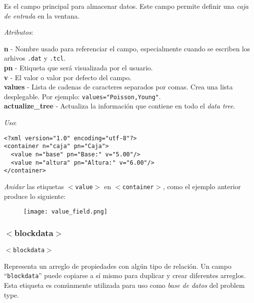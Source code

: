 \documentclass[10pt, a4paper, twocolumn]{article}
\begin{document}
Es el campo principal para almacenar datos. Este campo permite definir una \textit{caja de entrada} en la ventana.

\vspace{0.15cm}
\textit{Atributos}:

\vspace{0.15cm}
	\textbf{n} - Nombre usado para referenciar el campo, especialmente cuando se escriben los arhivos \texttt{.dat} y \texttt{.tcl}.\\
	\textbf{pn} - Etiqueta que será visualizada por el usuario.\\
	\textbf{v} - El valor o valor por defecto del campo.\\
	\textbf{values} - Lista de cadenas de caracteres separados por comas. Crea una lista desplegable. Por ejemplo: \texttt{values="Poisson,Young"}.\\
	\textbf{actualize\_tree} - Actualiza la información que contiene en todo el \textit{data tree}.
\vspace{0.15cm}

\textit{Uso}:
\vspace{0.15cm}

\lstset{language=XML} 
\begin{lstlisting}[caption={Creación de <value> para almacenar datos.}]
<?xml version="1.0" encoding="utf-8"?>
<container n="caja" pn="Caja">
  <value n="base" pn="Base:" v="5.00"/>
  <value n="altura" pn="Altura:" v="6.00"/>
</container>
\end{lstlisting}

\textit{Anidar} las etiquetas \texttt{$<$value$>$} en \texttt{$<$container$>$}, como el ejemplo anterior produce lo siguiente:

\begin{figure}[hbtp!]
	\centering
	\texttt{[image: value\_field.png]}
\end{figure}


\subsubsection{$<$blockdata$>$}

\vspace{0.20cm}
\begin{center}
	\texttt{$<$blockdata$>$}
\end{center}
\vspace{0.20cm}

Representa un arreglo de propiedades con algún tipo de relación. Un campo ``\texttt{blockdata}'' puede copiarse a sí mismo para duplicar y crear diferentes arreglos. Esta etiqueta es comúnmente utilizada para uso como \textit{base de datos} del problem type.
\end{document}
